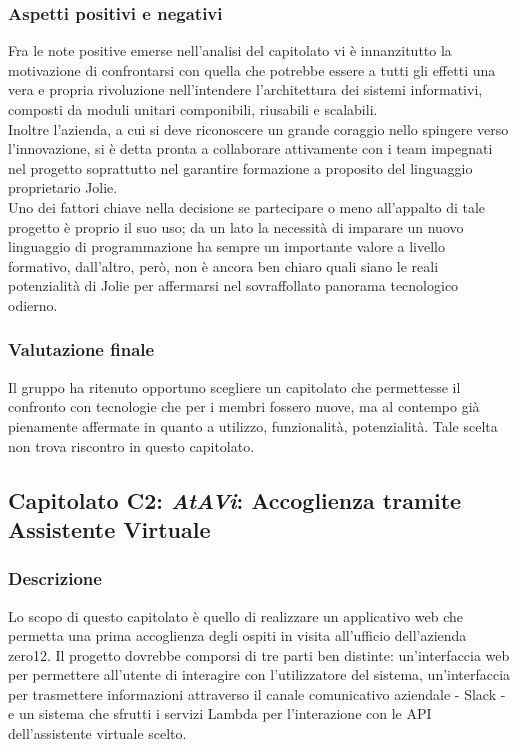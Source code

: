 		\subsubsection{Aspetti positivi e negativi}
		Fra le note positive emerse nell'analisi del capitolato vi è innanzitutto la motivazione di confrontarsi con quella che potrebbe essere 
		a tutti gli effetti una vera e propria rivoluzione nell'intendere l'architettura dei sistemi informativi, composti da moduli unitari 
		componibili, riusabili e scalabili.\\
		Inoltre l'azienda, a cui si deve riconoscere un grande coraggio nello spingere verso l'innovazione, si è detta pronta a collaborare attivamente 
		con i team impegnati nel progetto soprattutto nel garantire formazione a proposito del linguaggio proprietario Jolie.\\
		Uno dei fattori chiave nella decisione se partecipare o meno all'appalto di tale progetto è proprio il suo uso; da un lato la necessità di 
		imparare un nuovo linguaggio di programmazione ha sempre un importante valore a livello formativo, dall'altro, però, non è ancora ben chiaro 
		quali siano le reali potenzialità di Jolie per affermarsi nel sovraffollato panorama tecnologico odierno.
		\subsubsection{Valutazione finale}
		Il gruppo \hx{} ha ritenuto opportuno scegliere un capitolato che permettesse il confronto con tecnologie che per i membri fossero nuove,
		ma al contempo già pienamente affermate in quanto a utilizzo, funzionalità, potenzialità. Tale scelta non trova riscontro in questo capitolato.
		
	\subsection{Capitolato C2: \emph{AtAVi}: Accoglienza tramite Assistente Virtuale}
		\subsubsection{Descrizione}
		Lo scopo di questo capitolato è quello di realizzare un applicativo web che permetta una prima accoglienza degli ospiti in visita all'ufficio 
		dell'azienda zero12. Il progetto dovrebbe comporsi di tre parti ben distinte: un'interfaccia web per permettere all'utente di interagire con 
		l'utilizzatore del sistema, un'interfaccia per trasmettere informazioni attraverso il canale comunicativo aziendale - Slack - e un sistema che 
		sfrutti i servizi  Lambda per l'interazione con le API dell'assistente virtuale scelto.
